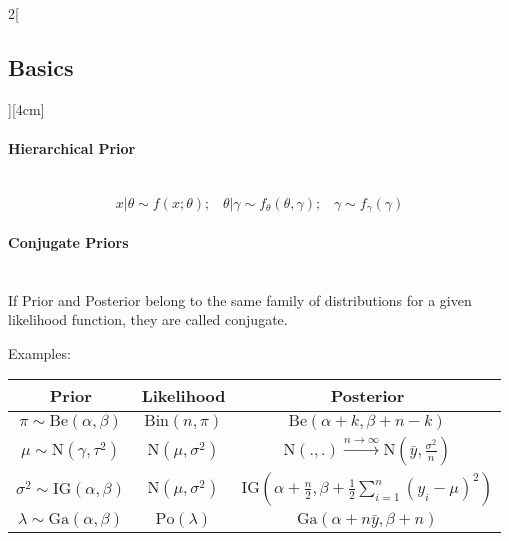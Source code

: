 \documentclass[8pt]{extarticle}
\begin{document}
\begin{multicols}{2}[\subsection{Basics}][4cm]
\paragraph{Hierarchical Prior} \ \\

$$x|\theta \sim f(x;\theta);\;\;\; \theta|\gamma \sim f_\theta(\theta, \gamma);\;\;\; \gamma \sim f_\gamma(\gamma)$$

\paragraph{Conjugate Priors}

\begin{Extensiv}
~\\
  \noindent If Prior and Posterior belong to the same family of distributions for a given likelihood function, they are called conjugate. 
\end{Extensiv}

\vspace{0.5em}
\noindent Examples:
\vspace{-0.5em}
\begin{center}
\begin{tabular}{ccc}
Prior & Likelihood & Posterior\\
\hline
$\pi \sim\mathrm{Be}(\alpha,\beta)$ & $\mathrm{Bin}(n,\pi)$ & $\mathrm{Be}(\alpha {+} k, \beta {+} n {-} k)$\\
 $\mu \sim \mathrm{N}(\gamma, \tau^2)$ & $\mathrm{N}(\mu, \sigma^2)$ & $\mathrm{N}(.,.)\overset{n\rightarrow\infty}{\longrightarrow} \mathrm{N}(\bar{y}, \frac{\sigma^2}{n})$\\
 $\sigma^2 \sim \mathrm{IG}(\alpha, \beta)$ & $\mathrm{N}(\mu, \sigma^2)$ & $\mathrm{IG}(\alpha{+}\frac{n}{2},\beta{+}\frac{1}{2}\sum_{i=1}^{n}(y_i{-}\mu)^2)$\\
 $\lambda \sim \mathrm{Ga}(\alpha, \beta)$ & $\mathrm{Po}(\lambda)$ & $\mathrm{Ga}(\alpha{+}n\bar{y}, \beta{+}n)$\\
\end{tabular}
\end{center}

\end{multicols}
\end{document}
